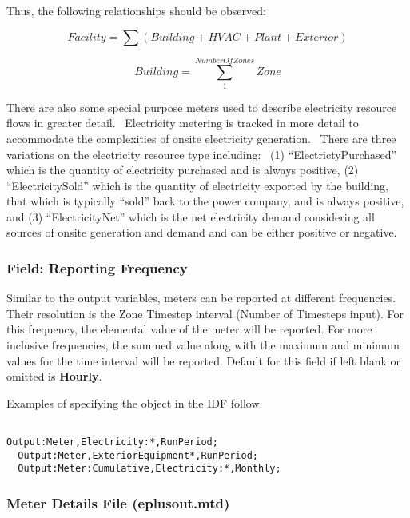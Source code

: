 Thus, the following relationships should be observed:

\begin{equation}
Facility = \sum {\left( {Building + HVAC + Plant + Exterior} \right)}
\end{equation}

\begin{equation}
Building = \sum\limits_1^{NumberOfZones} {Zone}
\end{equation}

There are also some special purpose meters used to describe electricity resource flows in greater detail.~ Electricity metering is tracked in more detail to accommodate the complexities of onsite electricity generation.~ There are three variations on the electricity resource type including:~ (1) ``ElectrictyPurchased'' which is the quantity of electricity purchased and is always positive, (2) ``ElectricitySold'' which is the quantity of electricity exported by the building, that which is typically ``sold'' back to the power company, and is always positive, and (3) ``ElectricityNet'' which is the net electricity demand considering all sources of onsite generation and demand and can be either positive or negative.

\subsubsection{Field: Reporting Frequency}\label{field-reporting-frequency-1}

Similar to the output variables, meters can be reported at different frequencies. Their resolution is the Zone Timestep interval (Number of Timesteps input). For this frequency, the elemental value of the meter will be reported. For more inclusive frequencies, the summed value along with the maximum and minimum values for the time interval will be reported. Default for this field if left blank or omitted is \textbf{Hourly}.

Examples of specifying the object in the IDF follow.

\begin{lstlisting}

Output:Meter,Electricity:*,RunPeriod;
  Output:Meter,ExteriorEquipment*,RunPeriod;
  Output:Meter:Cumulative,Electricity:*,Monthly;
\end{lstlisting}

\subsubsection{Meter Details File (eplusout.mtd)}\label{meter-details-file-eplusout.mtd}


